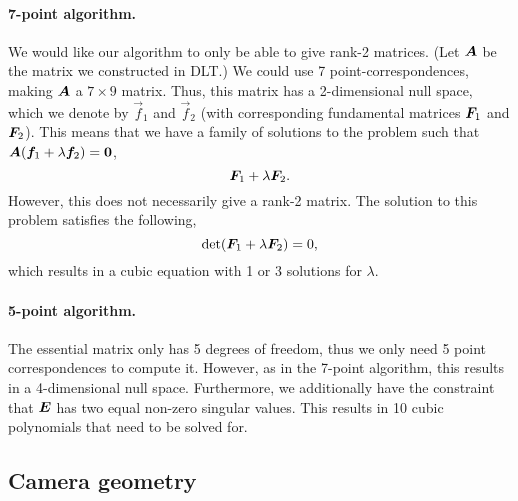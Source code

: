 \paragraph{7-point algorithm.}

We would like our algorithm to only be able to give rank-2 matrices. (Let
$\bm{A}$ be the matrix we constructed in DLT.) We could use 7
point-correspondences, making $\bm{A}$ a $7\times 9$ matrix. Thus, this matrix
has a 2-dimensional null space, which we denote by $\vec{f}_1$ and $\vec{f}_2$
(with corresponding fundamental matrices $\bm{F}_1$ and $\bm{F}_2$). This
means that we have a family of solutions to the problem such that $\bm{A}
(\bm{f}_1 + \lambda \bm{f}_2) =
\bm{0}$, \[
  \bm{F}_1 + \lambda \bm{F}_2
.\]
However, this does not necessarily give a rank-2 matrix. The solution to this
problem satisfies the following, \[
  \det{\mat{F}_1 + \lambda \mat{F}_2} = 0
,\]
which results in a cubic equation with 1 or 3 solutions for $\lambda$.

\paragraph{5-point algorithm.}

The essential matrix only has 5 degrees of freedom, thus we only need 5 point
correspondences to compute it. However, as in the 7-point algorithm, this
results in a 4-dimensional null space. Furthermore, we additionally have the
constraint that $\bm{E}$ has two equal non-zero singular values. This results
in 10 cubic polynomials that need to be solved for.

\subsection{Camera geometry}

